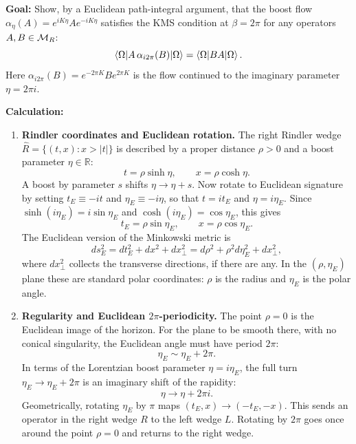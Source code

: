 \begin{workedexamplebox}
\textbf{Goal:} Show, by a Euclidean path-integral argument, that the boost flow
$\alpha_\eta(A) = e^{i K \eta} A e^{-i K \eta}$ satisfies the KMS condition at $\beta = 2\pi$ for any
operators $A, B \in \mathcal{M}_R$:
\[
\braket{\Omega | A\,\alpha_{i 2\pi}(B) | \Omega} = \braket{\Omega | B A | \Omega} .
\]
Here $\alpha_{i2\pi}(B)=e^{-2\pi K}Be^{2\pi K}$ is the flow continued to the imaginary parameter
$\eta=2\pi i$.

\textbf{Calculation:}
\begin{enumerate}[leftmargin=*]
\item \textbf{Rindler coordinates and Euclidean rotation.}
The right Rindler wedge $\widehat R = \{(t,x) : x > |t|\}$ is described by a proper distance $\rho > 0$ and a
boost parameter $\eta \in \mathbb{R}$:
\[
t = \rho \sinh\eta, \qquad x = \rho \cosh\eta .
\]
A boost by parameter $s$ shifts $\eta \to \eta + s$. Now rotate to Euclidean signature by setting
$t_E \equiv -i t$ and $\eta_E \equiv -i \eta$, so that $t=it_E$ and $\eta=i\eta_E$. Since
$\sinh(i\eta_E)=i\sin\eta_E$ and $\cosh(i\eta_E)=\cos\eta_E$, this gives
\[
t_E = \rho \sin\eta_E, \qquad x = \rho \cos\eta_E .
\]
The Euclidean version of the Minkowski metric is
\[
ds_E^2 = dt_E^2 + dx^2 + dx_\perp^2 = d\rho^2 + \rho^2 d\eta_E^2 + dx_\perp^2 ,
\]
where $dx_\perp^2$ collects the transverse directions, if there are any. In the $(\rho, \eta_E)$ plane these are
standard polar coordinates: $\rho$ is the radius and $\eta_E$ is the polar angle.

\item \textbf{Regularity and Euclidean $2\pi$-periodicity.}
The point $\rho = 0$ is the Euclidean image of the horizon. For the plane to be smooth there, with no conical
singularity, the Euclidean angle must have period $2\pi$:
\[
\eta_E \sim \eta_E + 2\pi .
\]
In terms of the Lorentzian boost parameter $\eta = i \eta_E$, the full turn $\eta_E\to\eta_E+2\pi$ is an
imaginary shift of the rapidity:
\[
\eta \longrightarrow \eta + 2\pi i .
\]
Geometrically, rotating $\eta_E$ by $\pi$ maps $(t_E, x) \to (-t_E, -x)$. This sends an operator in the right
wedge $R$ to the left wedge $L$. Rotating by $2\pi$ goes once around the point $\rho = 0$ and returns to the
right wedge.


\end{enumerate}
\end{workedexamplebox}
